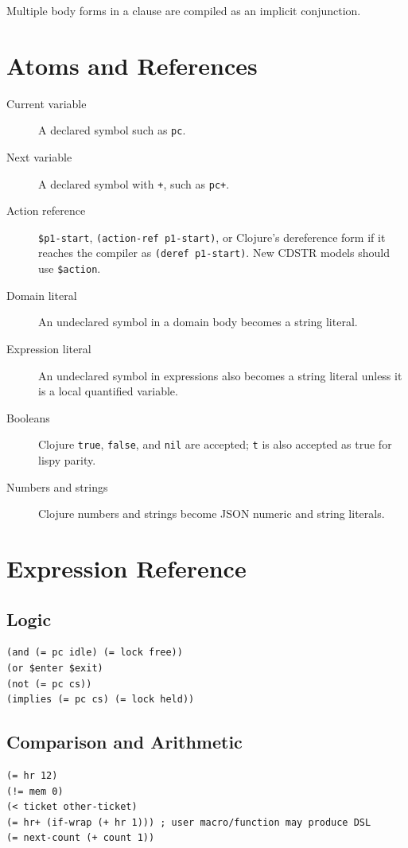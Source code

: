 \documentclass[11pt]{article}
\begin{document}
Multiple body forms in a clause are compiled as an implicit conjunction.

\section{Atoms and References}

\begin{description}
\item[Current variable] A declared symbol such as \texttt{pc}.
\item[Next variable] A declared symbol with \texttt{+}, such as \texttt{pc+}.
\item[Action reference] \texttt{\$p1-start}, \texttt{(action-ref p1-start)}, or
  Clojure's dereference form if it reaches the compiler as \texttt{(deref
  p1-start)}.  New CDSTR models should use \texttt{\$action}.
\item[Domain literal] An undeclared symbol in a domain body becomes a string
  literal.
\item[Expression literal] An undeclared symbol in expressions also becomes a
  string literal unless it is a local quantified variable.
\item[Booleans] Clojure \texttt{true}, \texttt{false}, and \texttt{nil} are
  accepted; \texttt{t} is also accepted as true for lispy parity.
\item[Numbers and strings] Clojure numbers and strings become JSON numeric and
  string literals.
\end{description}

\section{Expression Reference}

\subsection{Logic}

\begin{lstlisting}[language=CDSTR]
(and (= pc idle) (= lock free))
(or $enter $exit)
(not (= pc cs))
(implies (= pc cs) (= lock held))
\end{lstlisting}

\subsection{Comparison and Arithmetic}

\begin{lstlisting}[language=CDSTR]
(= hr 12)
(!= mem 0)
(< ticket other-ticket)
(= hr+ (if-wrap (+ hr 1))) ; user macro/function may produce DSL
(= next-count (+ count 1))
\end{lstlisting}
\end{document}
